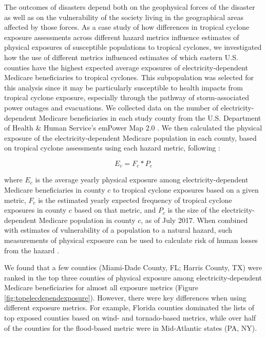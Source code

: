 \documentclass[11pt, titlepage]{article}
\begin{document}
The outcomes of disasters depend both on the geophysical forces of the disaster as well as on the vulnerability of the society living in the geographical areas affected by those forces. \citep{chakraborty2005population, anderson2003community, cutter1996vulnerability} As a case study of how differences in tropical cyclone exposure assessments across different hazard metrics influence estimates of physical exposures of susceptible populations to tropical cyclones, we investigated how the use of different metrics influenced estimates of which eastern U.S. counties have the highest expected average exposures of electricity-dependent Medicare beneficiaries to tropical cyclones. This subpopulation was selected for this analysis since it may be particularly susceptible to health impacts from tropical cyclone exposure, especially through the pathway of storm-associated power outages and evacuations. We collected data on the number of electricity-dependent Medicare beneficiaries in each study county from the U.S. Department of Health \& Human Service's emPower Map 2.0 \citep{empower}. We then calculated the physical exposure of the electricity-dependent Medicare population in each county, based on tropical cyclone assessments using each hazard metric, following \citep{peduzzi2009assessing}:

\begin{equation}
E_c = F_c * P_c
\end{equation}

\noindent where $E_c$ is the average yearly physical exposure among electricity-dependent Medicare beneficiaries in county $c$ to tropical cyclone exposures based on a given metric, $F_c$ is the estimated yearly expected frequency of tropical cyclone exposures in county $c$ based on that metric, and $P_c$ is the size of the electricity-dependent Medicare population in county $c$, as of July 2017. When combined with estimates of vulnerability of a population to a natural hazard, such measurements of physical exposure can be used to calculate risk of human losses from the hazard \citep{peduzzi2009assessing}.

We found that a few counties (Miami-Dade County, FL; Harris County, TX) were ranked in the top three counties of physical exposure among electricity-dependent Medicare beneficiaries for almost all exposure metrics (Figure \ref{fig:topelecdependexposure}). However, there were key differences when using different exposure metrics. For example, Florida counties dominated the lists of top exposed counties based on wind- and tornado-based metrics, while over half of the counties for the flood-based metric were in Mid-Atlantic states (PA, NY).
\end{document}
